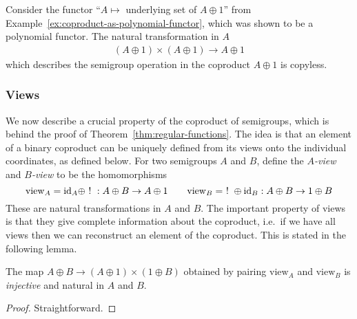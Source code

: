 \begin{example}\label{ex:copyless-on-coproducts}
    Consider the functor \enquote{$A\mapsto$ underlying set of $A \oplus 1$} from Example~\ref{ex:coproduct-as-polynomial-functor}, which was shown to be a polynomial functor. The natural transformation in $A$
    \begin{align*}
    (A \oplus 1)\times (A \oplus 1) \longrightarrow A \oplus 1
    \end{align*}
    which describes the semigroup operation in the coproduct $A \oplus 1$ is copyless.
\end{example}


\subsubsection{Views}
\label{sec:views}

\newcommand{\combine}{\mathrm{combine}}
\newcommand{\view}{\mathrm{view}}

We now describe a crucial property of the coproduct of semigroups, which is behind the proof of Theorem~\ref{thm:regular-functions}. The idea is that an element of a binary coproduct can be uniquely defined from its views onto the individual coordinates, as defined below. 
For two semigroups $A$ and $B$, define the \emph{$A$-view} and \emph{$B$-view} to be the homomorphisms
\[
    \view_A = \id_A \oplus ~!~ : A \oplus B \to A \oplus 1 \qquad 
    \view_B = ~!~ \oplus \id_B : A \oplus B \to 1 \oplus B
\]
These are natural transformations in $A$ and $B$. The important property of views is that they give complete information about the coproduct, i.e.~if we have all views then we can reconstruct an element of the coproduct.
This is stated in the following lemma. 

\begin{lemma}
\label{lem:views}
The map $A \oplus B \to (A \oplus 1) \times (1 \oplus B)$ obtained by pairing $\view_A$ and $\view_B$ is \emph{injective} and natural in $A$ and $B$.
\end{lemma}
\begin{proof}
    Straightforward.
\end{proof}

